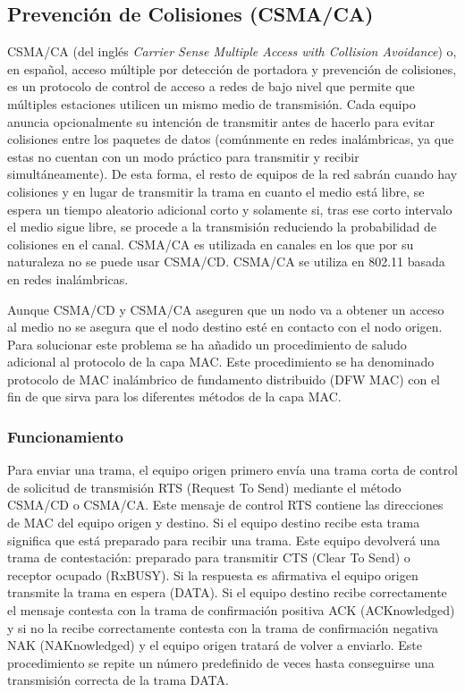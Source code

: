 \documentclass[a4paper]{article}
\begin{document}
	\subsection{Prevención de Colisiones (CSMA/CA)}
	CSMA/CA (del inglés \textit{Carrier Sense Multiple Access with Collision Avoidance}) o, en español, acceso múltiple por detección de portadora y prevención de colisiones, es un protocolo de control de acceso a redes de bajo nivel que permite que múltiples estaciones utilicen un mismo medio de transmisión. Cada equipo anuncia opcionalmente su intención de transmitir antes de hacerlo para evitar colisiones entre los paquetes de datos (comúnmente en redes inalámbricas, ya que estas no cuentan con un modo práctico para transmitir y recibir simultáneamente). De esta forma, el resto de equipos de la red sabrán cuando hay colisiones y en lugar de transmitir la trama en cuanto el medio está libre, se espera un tiempo aleatorio adicional corto y solamente si, tras ese corto intervalo el medio sigue libre, se procede a la transmisión reduciendo la probabilidad de colisiones en el canal. CSMA/CA es utilizada en canales en los que por su naturaleza no se puede usar CSMA/CD. CSMA/CA se utiliza en 802.11 basada en redes inalámbricas.
	
	Aunque CSMA/CD y CSMA/CA aseguren que un nodo va a obtener un acceso al medio no se asegura que el nodo destino esté en contacto con el nodo origen. Para solucionar este problema se ha añadido un procedimiento de saludo adicional al protocolo de la capa MAC. Este procedimiento se ha denominado protocolo de MAC inalámbrico de fundamento distribuido (DFW MAC) con el fin de que sirva para los diferentes métodos de la capa MAC.
	
	\subsubsection{Funcionamiento}
	
	Para enviar una trama, el equipo origen primero envía una trama corta de control de solicitud de transmisión RTS (Request To Send) mediante el método CSMA/CD o CSMA/CA. Este mensaje de control RTS contiene las direcciones de MAC del equipo origen y destino. Si el equipo destino recibe esta trama significa que está preparado para recibir una trama. Este equipo devolverá una trama de contestación: preparado para transmitir CTS (Clear To Send) o receptor ocupado (RxBUSY). Si la respuesta es afirmativa el equipo origen transmite la trama en espera (DATA). Si el equipo destino recibe correctamente el mensaje contesta con la trama de confirmación positiva ACK (ACKnowledged) y si no la recibe correctamente contesta con la trama de confirmación negativa NAK (NAKnowledged) y el equipo origen tratará de volver a enviarlo. Este procedimiento se repite un número predefinido de veces hasta conseguirse una transmisión correcta de la trama DATA.
	
\end{document}
